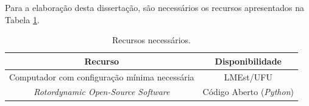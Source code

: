 Para a elaboração desta dissertação, são necessários os recursos apresentados na Tabela \ref{tab_recursos}.

\begin{table}[H]
	\centering  
	\renewcommand{\arraystretch}{1.2}
	\caption{Recursos necessários.}
	\begin{tabular}{cc}
		\hline
		\textbf{Recurso}                                  & \textbf{Disponibilidade}       \\ \hline
		Computador com configuração mínima necessária     & LMEst/UFU              \\
		\textit{Rotordynamic Open-Source Software}      & Código Aberto (\textit{Python})    \\ \hline
	\end{tabular}
	\label{tab_recursos}
\end{table}